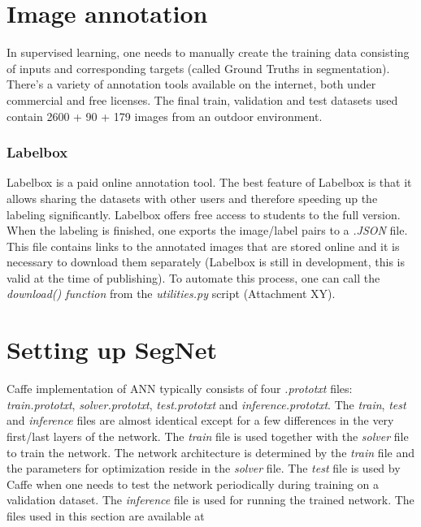 \newpage
\section{Image annotation}

In supervised learning, one needs to manually create the training data consisting of inputs and corresponding targets (called Ground Truths in segmentation). There's a variety of annotation tools available on the internet, both under commercial and free licenses. 
The final train, validation and test datasets used contain 2600 + 90 + 179 images from an outdoor environment.

\subsubsection{Labelbox}

Labelbox \cite{labelbox} is a paid online annotation tool. The best feature of Labelbox is that it allows sharing the datasets with other users and therefore speeding up the labeling significantly. Labelbox offers free access to students to the full version. When the labeling is finished, one exports the image/label pairs to a \textit{.JSON} file. This file contains links to the annotated images that are stored online and it is necessary to download them separately (Labelbox is still in development, this is valid at the time of publishing). To automate this process, one can call the \textit{download() function} from the \textit{utilities.py} script (Attachment XY). 



\section{Setting up SegNet}

Caffe implementation of ANN typically consists of four \textit{.prototxt} files: \textit{train.prototxt}, \textit{solver.prototxt}, \textit{test.prototxt} and \textit{inference.prototxt}. The \textit{train}, \textit{test} and \textit{inference} files are almost identical except for a few differences in the very first/last layers of the network. The \textit{train} file is used together with the \textit{solver} file to train the network. The network architecture is determined by the \textit{train} file and the parameters for optimization reside in the \textit{solver} file. The \textit{test} file is used by Caffe when one needs to test the network periodically during training on a validation dataset. \cite{caffe} The \textit{inference} file is used for running the trained network. The files used in this section are available at \cite{filip_github}

